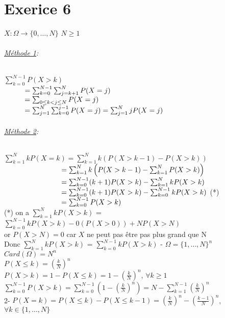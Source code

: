 \documentclass{article}
\author{Frederic Becerril}
\newcommand\tab[1][1cm]{\hspace*{#1}}
\begin{document}
\part*{Exerice 6}

$X : \Omega \rightarrow \{0, \dots, N\}$ $N \geq 1$
\paragraph{\underline{Méthode 1}:} $\sum_{k = 0}^{N-1}P(X > k)$\\
$\tab = \sum_{k=0}^{N-1} \sum_{j = k+1}^N P(X=j)$ \vspace{2mm}\\
$\tab = \sum_{0 \leq k < j \leq N} P(X=j)$\\
$\tab = \sum_{j = 1}^N \sum_{k=0}^{j-1} P(X=j) = \sum_{j = 1}^N jP(X=j)$\\
\paragraph{\underline{Méthode 2}:\\}
$\sum_{k = 1}^N kP(X=k) = \sum_{k =1}^N k(P(X > k - 1) - P(X > k))$\\
$\tab[2.8cm] = \sum_{k =1}^N k\left(P(X > k - 1) - \sum_{k =1}^N P(X > k)\right)$\\
$\tab[2.8cm] = \sum_{k =0}^{N -1} (k + 1)P(X > k) - \sum_{k =1}^N kP(X > k)$\\
$\tab[2.8cm] = \sum_{k =0}^{N -1} (k + 1)P(X > k) -  \sum_{k = 0}^{N - 1} kP(X > k)$ (*)\\
$\tab[2.8cm] = \sum_{k =0}^{N -1} P(X > k)$\vspace{1cm}\\
(*) on a $\sum_{k =1}^N kP(X > k)$ = $\sum_{k = 0}^{N - 1} kP(X > k) - 0(P(X > 0)) + NP(X > N)$\\
or $P(X > N) = 0$ car $X$ ne peut pas être pas plus grand que N\\
Donc $\sum_{k =1}^N kP(X > k)$  = $\sum_{k = 0}^{N - 1} kP(X > k)$
\newpage
{}- $\Omega = \{1, \dots, N\}^n$\\
$Card(\Omega) = N^n$\\
$P(X \leq k) = \left(\frac{k}{N}\right)^n$\\
$P(X > k) = 1 - P(X \leq k) = 1 - \left(
    \frac{k}{N}
\right)^n$, $\forall k \geq 1$\\
$\sum_{k=0}^{N-1} P(X > k) = \sum_{k=0}^{N-1} \left(1 - \left(\frac{k}{N}\right)^n\right) = N - \sum_{k=1}^{N-1} \left(\frac{k}{N}\right)^n$\\
2- $P(X = k) = P(X \leq k) - P(X \leq k - 1) = \left(\frac{k}{N}\right)^n - \left(\frac{k-1}{N}\right)^n$, $\forall k \in \{1, \dots, N\}$
\end{document}
